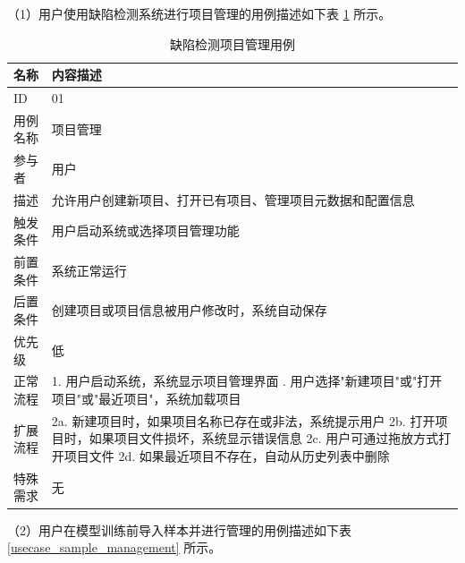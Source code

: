 \documentclass[
  ]{njuthesis}
\begin{document}
（1）用户使用缺陷检测系统进行项目管理的用例描述如下表 \ref{usecase_project_management} 所示。

\begin{table}[H]
    \centering
    \caption{缺陷检测项目管理用例}
    \label{usecase_project_management}
    \renewcommand\arraystretch{0.5}
    \begin{tabular}{p{2.5cm}p{11cm}}
    \toprule[1.5pt]
    名称 & 内容描述 \\
    \midrule[1pt]
    ID & 01 \\
    \midrule[0.5pt]
    用例名称 & 项目管理 \\
    \midrule[0.5pt]
    参与者 & 用户 \\
    \midrule[0.5pt]
    描述 & 允许用户创建新项目、打开已有项目、管理项目元数据和配置信息 \\
    \midrule[0.5pt]
    触发条件 & 用户启动系统或选择项目管理功能 \\
    \midrule[0.5pt]
    前置条件 & 系统正常运行 \\
    \midrule[0.5pt]
    后置条件 & 创建项目或项目信息被用户修改时，系统自动保存 \\
    \midrule[0.5pt]
    优先级 & 低 \\
    \midrule[0.5pt]
    正常流程 & 1. 用户启动系统，系统显示项目管理界面 \newline
    2. 用户选择"新建项目"或"打开项目"或"最近项目"，系统加载项目 \\
    \midrule[0.5pt]
    扩展流程 & 2a. 新建项目时，如果项目名称已存在或非法，系统提示用户 \newline
    2b. 打开项目时，如果项目文件损坏，系统显示错误信息 \newline
    2c. 用户可通过拖放方式打开项目文件 \newline
    2d. 如果最近项目不存在，自动从历史列表中删除 \\
    \midrule[0.5pt]
    特殊需求 & 无 \\
    \bottomrule[1.5pt]
    \end{tabular}
\end{table}

（2）用户在模型训练前导入样本并进行管理的用例描述如下表 \ref{usecase_sample_management} 所示。
\end{document}
